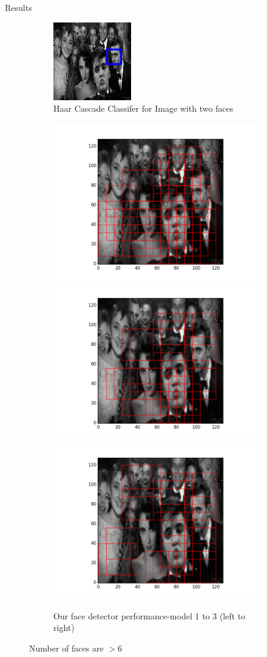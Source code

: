 \documentclass{beamer}
\begin{document}
\begin{frame}{Results}
\begin{figure}[h!]
  \begin{subfigure}{\linewidth}
  \centering
  \includegraphics[width=.3\linewidth]{twitterhaar.png}\hfill
  \caption{Haar Cascade Classifer for Image with two faces}
  \end{subfigure}\par\medskip
  \begin{subfigure}{\linewidth}
  \includegraphics[width=.3\linewidth]{twitter83.png}\hfill
  \includegraphics[width=.3\linewidth]{twitter91.png}\hfill
  \includegraphics[width=.3\linewidth]{twitter94.png}
  \caption{Our face detector performance-model 1 to 3 (left to right)}
  \end{subfigure}\par\medskip
  \caption{Number of faces are $>$6}
\end{figure}
\end{frame}
\end{document}
